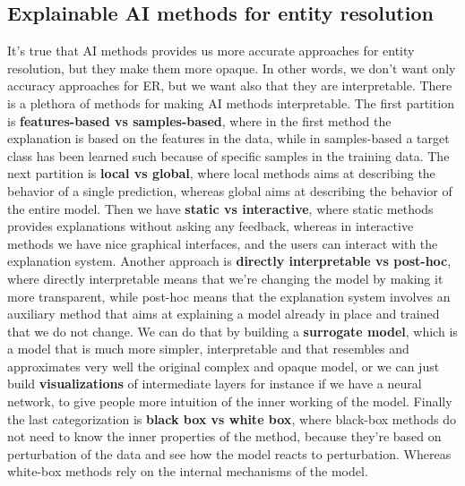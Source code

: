 \documentclass[11pt]{article}
\begin{document}
\subsection{Explainable AI methods for entity resolution}
It's true that AI methods provides us more accurate approaches for entity resolution, but they make them more opaque. In other words, we don't want only accuracy approaches for ER, but we want also that they are interpretable. There is a plethora of methods for making AI methods interpretable. The first partition is \textbf{features-based vs samples-based}, where in the first method the explanation is based on the features in the data, while in samples-based a target class has been learned such because of specific samples in the training data. The next partition is \textbf{local vs global}, where local methods aims at describing the behavior of a single prediction, whereas global aims at describing the behavior of the entire model. Then we have \textbf{static vs interactive}, where static methods provides explanations without asking any feedback, whereas in interactive methods we have nice graphical interfaces, and the users can interact with the explanation system. Another approach is \textbf{directly interpretable vs post-hoc}, where directly interpretable means that we're changing the model by making it more transparent, while post-hoc means that the explanation system involves an auxiliary method that aims at explaining a model already in place and trained that we do not change. We can do that by building a \textbf{surrogate model}, which is a model that is much more simpler, interpretable and that resembles and approximates very well the original complex and opaque model, or we can just build \textbf{visualizations} of intermediate layers for instance if we have a neural network, to give people more intuition of the inner working of the model. Finally the last categorization is \textbf{black box vs white box}, where black-box methods do not need to know the inner properties of the method, because they're based on perturbation of the data and see how the model reacts to perturbation. Whereas white-box methods rely on the internal mechanisms of the model. 
\end{document}
